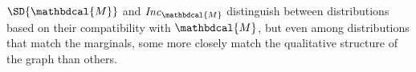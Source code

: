 \documentclass[letterpaper]{article} %
\theoremstyle{plain}
\theoremstyle{definition}
\theoremstyle{remark}
\newcommand{\commentout}[1]{\ignorespaces}
\newcommand{\V}{\mathcal V}
\newcommand{\dg}[1]{\mathbdcal{#1}}
\newcommand\Inc{\mathit{Inc}}
\newcommand{\ed}[3]{#2\!%
  \overset{\smash{\mskip-5mu\raisebox{-1pt}{$\scriptscriptstyle
        #1$}}}{\rightarrow}\! #3}
\begin{document}
$\SD{\dg M}$ and $\Inc_{\dg M}$ distinguish %
between distributions based on their compatibility with
$\dg M$, but even among distributions that match the
marginals, some more closely match the qualitative structure
of the graph than others.  
\commentout{
    Suppose an agent has a PDG $\dg M$ in mind, and imagines that all sample
    variation in a joint distribution $\mu$ over $\V(\dg M)$ arises as a result
    of sampling the value of a target variable $Y$ of some edge $\ed LXY$, given the
    value of $X$. If this is the case, one would expect the total amount of
    information required to communicate a sample of $\mu$ to be the same as the
    total amount of the information required to separately encode, for
    each edge $\ed LXY$, the randomness of $Y$ given $X$.

}
\end{document}

